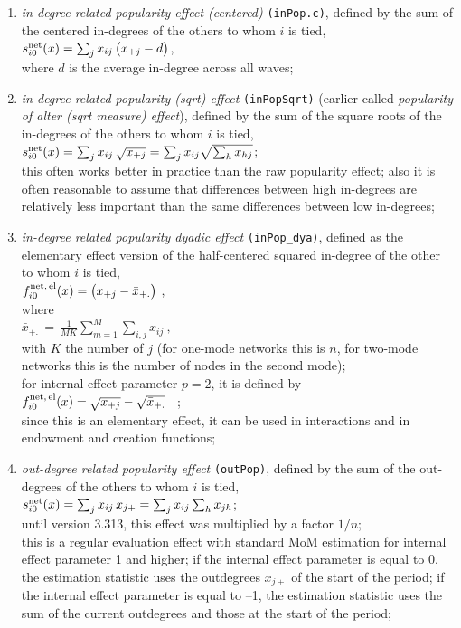 \documentclass[a4paper,fleqn,11pt]{article}
\newcommand{\+}{\, + \,}
\newcommand{\vit}{\theenumi}
\begin{document}
\begin{enumerate}
 \item {\em in-degree related popularity effect (centered)} \texttt{(inPop.c)},
 defined by the sum of
 the centered in-degrees of the others to whom $i$ is tied,\\
 $s^{\rm net}_{i\vit}(x) =  \sum_j x_{ij}\, \big( x_{+j} - d \big)$,\\
 where $d$ is the average in-degree across all waves;

 \item {\em in-degree related popularity (sqrt) effect} \texttt{(inPopSqrt)}
 (earlier called {\em popularity of alter (sqrt measure) effect}), defined by the sum of
 the square roots of the in-degrees of the others to whom $i$ is tied,\\
 $s^{\rm net}_{i\vit}(x) = \sum_j x_{ij}\, \sqrt{x_{+j}} =
  \sum_j x_{ij} \sqrt{\sum_h x_{hj}} $;\\
 this often works better in practice than the raw popularity effect;
 also it is often reasonable to assume that differences between high in-degrees are
 relatively less important than the same differences between low
 in-degrees;


 \item {\em in-degree related popularity dyadic effect} \texttt{(inPop\_dya)},
 	 defined as the elementary effect version of the half-centered
 squared in-degree of the other to whom $i$ is tied,\\
 $ f^{\rm net,\, el}_{i\vit}(x)  =  \big(  x_{+j} - \bar x_{+.}\big)$ ,\\
 where\\
 $ \bar x_{+.} \,=\,  \frac{1}{MK} \sum_{m=1}^M \sum_{i,j} x_{ij} \ ,  $ \\
 with $K$ the number of $j$ (for one-mode networks this is $n$,
 for two-mode networks this is the number of nodes in the second mode);\\
 for internal effect parameter $p=2$, it is defined by\\
 $f^{\rm net,\, el}_{i\vit}(x)  =   \sqrt{  x_{+j}}  - \sqrt{ \bar x_{+.}} $ \ ; \\
 since this is an elementary effect, it can be used in interactions
 and in endowment and creation functions;

 \item {\em out-degree related popularity effect} \texttt{(outPop)}, defined by
  the sum of the out-degrees
 of the others to whom $i$ is tied,\\
 $s^{\rm net}_{i\vit}(x) =  \sum_j x_{ij}\, x_{j+} =
  \sum_j x_{ij} \sum_h x_{jh} $; \\
 until version 3.313, this effect was multiplied by a factor $1/n$;\\
 this is a regular evaluation effect with standard MoM estimation
 for internal effect parameter 1 and higher;
  if the internal effect parameter is equal to 0, the estimation statistic uses
  the outdegrees $x_{j+} $ of the start of the period;
  if the internal effect parameter is equal to --1, the estimation statistic uses
  the sum of the current outdegrees and those at the start of the period;


\end{enumerate}
\end{document}
